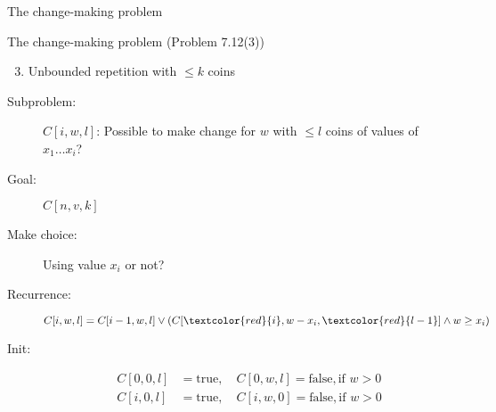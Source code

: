 \begin{frame}{The change-making problem}
  \begin{exampleblock}{The change-making problem (Problem 7.12(3))}
	\begin{enumerate}[(1)]
	  \setcounter{enumi}{2}
	  \item Unbounded repetition with $\le k$ coins
	\end{enumerate}
  \end{exampleblock}

  \pause
  \begin{description}
	\item[Subproblem:] $C[i,w,l]$: Possible to make change for $w$ with $\le l$ coins of values of $x_{1} \dots x_{i}$?
	\item[Goal:] $C[n,v,k]$
	  \pause
	\item[Make choice:] Using value $x_{i}$ or not? 
	\item[Recurrence:] 
	  \[
		C[i,w,l] = C[i-1,w,l] \lor \left( C[\textcolor{red}{i}, w-x_{i}, \textcolor{red}{l-1}] \land w \ge x_{i} \right)
	  \]
	  \pause
	\item[Init:]
	  \begin{align*}
		C[0,0,l] &= \text{true}, \quad C[0,w,l] = \text{false}, \text{if } w > 0 \\
		C[i,0,l] &= \text{true}, \quad C[i,w,0] = \text{false}, \text{if } w > 0
	  \end{align*}
  \end{description}
\end{frame}
